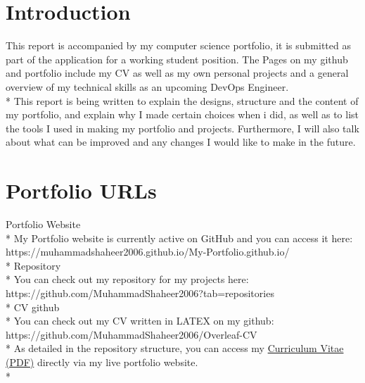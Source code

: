 \documentclass{turabian}
\begin{document}

\content

\section{\large Introduction}
\vspace{-4mm}

This report is accompanied by my computer science portfolio, it is submitted as part of the application for a working student position.
The Pages on my github and portfolio include my CV as well as my own personal projects and a general overview of my technical skills as an upcoming DevOps Engineer.\\*
This report is being written to explain the designs, structure and the content of my portfolio, and explain why I made certain choices when i did, as well as to list the tools I used in making my portfolio and projects. Furthermore, I will also talk about what can be improved and any changes I would like to make in the future.

\section{\large Portfolio URLs}
\vspace{-4mm}

{\Large Portfolio Website}\\*
\vspace{3mm}
My Portfolio website is currently active on GitHub and you can access it here:
https://muhammadshaheer2006.github.io/My-Portfolio.github.io/\\*
\vspace{3mm}
{\Large Repository}\\*
\vspace{3mm}
You can check out my repository for my projects here:
https://github.com/MuhammadShaheer2006?tab=repositories\\*
{\Large CV github}\\*
\vspace{3mm}
You can check out my CV written in LATEX on my github:
https://github.com/MuhammadShaheer2006/Overleaf-CV\\*
As detailed in the repository structure, you can access my 
\href{https://muhammadshaheer2006.github.io/My-Portfolio.github.io/CV%20(1).pdf}{Curriculum Vitae (PDF)} 
directly via my live portfolio website.\\*
\end{document}
